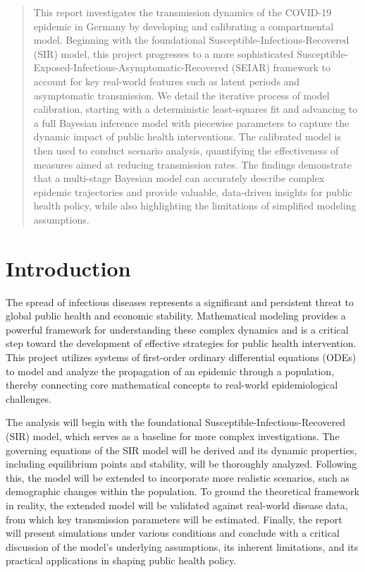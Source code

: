\documentclass[12pt, a4paper]{article}
\begin{document}
\begin{abstract}
    This report investigates the transmission dynamics of the COVID-19 epidemic in Germany by developing and calibrating a compartmental model. Beginning with the foundational Susceptible-Infectious-Recovered (SIR) model, this project progresses to a more sophisticated Susceptible-Exposed-Infectious-Asymptomatic-Recovered (SEIAR) framework to account for key real-world features such as latent periods and asymptomatic transmission. We detail the iterative process of model calibration, starting with a deterministic least-squares fit and advancing to a full Bayesian inference model with piecewise parameters to capture the dynamic impact of public health interventions. The calibrated model is then used to conduct scenario analysis, quantifying the effectiveness of measures aimed at reducing transmission rates. The findings demonstrate that a multi-stage Bayesian model can accurately describe complex epidemic trajectories and provide valuable, data-driven insights for public health policy, while also highlighting the limitations of simplified modeling assumptions.
\end{abstract}
\clearpage
\tableofcontents
\newpage


\section{Introduction}
The spread of infectious diseases represents a significant and persistent threat to global public health and economic stability. Mathematical modeling provides a powerful framework for understanding these complex dynamics and is a critical step toward the development of effective strategies for public health intervention. This project utilizes systems of first-order ordinary differential equations (ODEs) to model and analyze the propagation of an epidemic through a population, thereby connecting core mathematical concepts to real-world epidemiological challenges.

The analysis will begin with the foundational Susceptible-Infectious-Recovered (SIR) model, which serves as a baseline for more complex investigations. The governing equations of the SIR model will be derived and its dynamic properties, including equilibrium points and stability, will be thoroughly analyzed. Following this, the model will be extended to incorporate more realistic scenarios, such as demographic changes within the population. To ground the theoretical framework in reality, the extended model will be validated against real-world disease data, from which key transmission parameters will be estimated. Finally, the report will present simulations under various conditions and conclude with a critical discussion of the model's underlying assumptions, its inherent limitations, and its practical applications in shaping public health policy.
\end{document}
